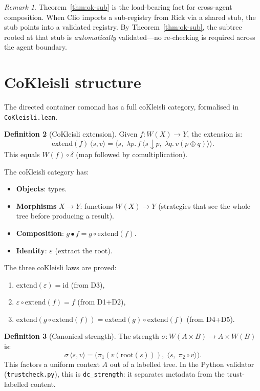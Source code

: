 \documentclass[11pt,a4paper]{article}
\theoremstyle{definition}
\newtheorem{definition}{Definition}[section]
\theoremstyle{plain}
\theoremstyle{remark}
\newtheorem{remark}[definition]{Remark}
\newcommand{\sub}{\mathop{\downarrow}}
\begin{document}
\begin{remark}
Theorem~\ref{thm:ok-sub} is the load-bearing fact for cross-agent
composition. When Clio imports a sub-registry from Rick via a shared
stub, the stub points into a validated registry. By
Theorem~\ref{thm:ok-sub}, the subtree rooted at that stub is
\emph{automatically} validated---no re-checking is required across the
agent boundary.
\end{remark}

\section{CoKleisli structure}

The directed container comonad has a full coKleisli category,
formalised in \texttt{CoKleisli.lean}.

\begin{definition}[CoKleisli extension]
Given $f : W(X) \to Y$, the extension is:
\[
  \mathrm{extend}(f)\,\langle s, v \rangle
  = \langle s,\; \lambda p.\, f\,\langle s \sub p,\; \lambda q.\, v(p \oplus q) \rangle \rangle.
\]
This equals $W(f) \circ \delta$ (map followed by comultiplication).
\end{definition}

The coKleisli category has:
\begin{itemize}[nosep]
  \item \textbf{Objects}: types.
  \item \textbf{Morphisms} $X \to Y$: functions $W(X) \to Y$
    (strategies that see the whole tree before producing a result).
  \item \textbf{Composition}: $g \bullet f = g \circ \mathrm{extend}(f)$.
  \item \textbf{Identity}: $\varepsilon$ (extract the root).
\end{itemize}

The three coKleisli laws are proved:
\begin{enumerate}[nosep]
  \item $\mathrm{extend}(\varepsilon) = \mathrm{id}$ \quad (from D3),
  \item $\varepsilon \circ \mathrm{extend}(f) = f$ \quad (from D1+D2),
  \item $\mathrm{extend}(g \circ \mathrm{extend}(f)) = \mathrm{extend}(g) \circ \mathrm{extend}(f)$ \quad (from D4+D5).
\end{enumerate}

\begin{definition}[Canonical strength]
The strength $\sigma : W(A \times B) \to A \times W(B)$ is:
\[
  \sigma\,\langle s, v \rangle = \bigl(\pi_1(v(\mathrm{root}(s))),\;
  \langle s,\; \pi_2 \circ v \rangle\bigr).
\]
This factors a uniform context $A$ out of a labelled tree. In the
Python validator (\texttt{trustcheck.py}), this is
\texttt{dc\_strength}: it separates metadata from the trust-labelled
content.
\end{definition}
\end{document}
